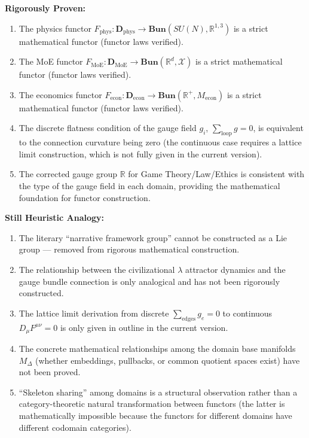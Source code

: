 \documentclass[12pt,a4paper]{article}
\theoremstyle{plain}
\theoremstyle{definition}
\newcommand{\R}{\mathbb{R}}
\begin{document}
\begin{scxbox}
\textbf{Rigorously Proven:}
\begin{enumerate}[label=(\arabic*)]
    \item The physics functor $F_{\text{phys}}: \mathbf{D}_{\text{phys}} \to \mathbf{Bun}(SU(N), \R^{1,3})$ is a strict mathematical functor (functor laws verified).
    \item The MoE functor $F_{\text{MoE}}: \mathbf{D}_{\text{MoE}} \to \mathbf{Bun}(\R^d, \mathcal{X})$ is a strict mathematical functor (functor laws verified).
    \item The economics functor $F_{\text{econ}}: \mathbf{D}_{\text{econ}} \to \mathbf{Bun}(\R^+, M_{\text{econ}})$ is a strict mathematical functor (functor laws verified).
    \item The discrete flatness condition of the gauge field $g_i$, $\sum_{\text{loop}} g = 0$, is equivalent to the connection curvature being zero (the continuous case requires a lattice limit construction, which is not fully given in the current version).
    \item The corrected gauge group $\R$ for Game Theory/Law/Ethics is consistent with the type of the gauge field in each domain, providing the mathematical foundation for functor construction.
\end{enumerate}

\textbf{Still Heuristic Analogy:}
\begin{enumerate}[label=(\arabic*)]
    \item The literary ``narrative framework group'' cannot be constructed as a Lie group — removed from rigorous mathematical construction.
    \item The relationship between the civilizational $\lambda$ attractor dynamics and the gauge bundle connection is only analogical and has not been rigorously constructed.
    \item The lattice limit derivation from discrete $\sum_{\text{edges}} g_e = 0$ to continuous $D_\mu F^{\mu\nu} = 0$ is only given in outline in the current version.
    \item The concrete mathematical relationships among the domain base manifolds $M_\Delta$ (whether embeddings, pullbacks, or common quotient spaces exist) have not been proved.
    \item ``Skeleton sharing'' among domains is a structural observation rather than a category-theoretic natural transformation between functors (the latter is mathematically impossible because the functors for different domains have different codomain categories).
\end{enumerate}


\end{scxbox}
\end{document}
